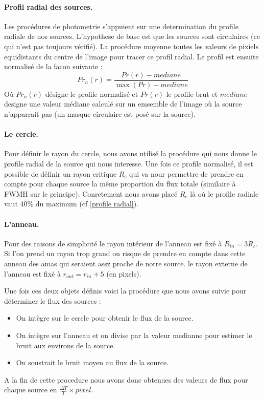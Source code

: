 \documentclass[a4paper,11pt]{article}
\begin{document}
\paragraph{Profil radial des sources.} Les procédures de photometrie s'appuient sur une determination 
du profile radiale de nos sources. L'hypothese de base est que les sources sont circulaires (ce qui n'est 
pas toujours vérifié). La procédure moyenne toutes les valeurs de pixiels equidistants du centre de l'image
pour tracer ce profil radial. Le profil est ensuite normalisé de la facon suivante  : 
\begin{equation}
Pr_n(r) = \frac{Pr(r) - mediane}{\max ( Pr) - mediane}
\end{equation} 
Où $Pr_n(r)$ désigne le profile normalisé et $Pr(r)$ le profile brut et $mediane$ designe une valeur médiane
calculé sur un emsemble de l'image où la source n'apparrait pas (un masque circulaire est posé sur la source).\\

\paragraph{Le cercle.} Pour définir le rayon du cercle, nous avons utilisé la procédure qui nous donne le
profile radial de la source qui nous interesse. Une fois ce profile normalisé, il est possible de définir un rayon critique
$R_c$ qui va nour permettre de prendre en compte pour chaque source la même proportion du flux totale
(similaire à FWMH sur le principe). Conretement nous avons placé $R_c$ là où le profile radiale vaut 40\% du maximum
(cf \ref{profile radial}). \\ 

\paragraph{L'anneau.} Pour des raisons de simplicité le rayon intérieur de l'anneau 
est fixé à $R_{in} = 3R_c $. Si l'on prend un rayon trop grand on risque de prendre en compte dans cette
anneau des amas qui seraient assz proche de notre source.  le rayon externe de l'anneau est fixé à 
$r_{out} = r_{in} + 5  $ (en pixels).

Une fois ces deux objets définis voici la procédure que nous avons suivie pour déterminer le
flux des sources : 
\begin{itemize}
\item On intègre sur le cercle pour obtenir le flux de la source.
\item On intègre sur l'anneau et on divise par la valeur medianne pour estimer le bruit 
aux environs de la source.
\item On soustrait le bruit moyen  au flux de la source.
\end{itemize}
A la fin de cette procedure nous avons donc obtenues des valeurs de flux pour chaque source en 
$\frac{\Delta T}{T}\times pixel $.
\end{document}
